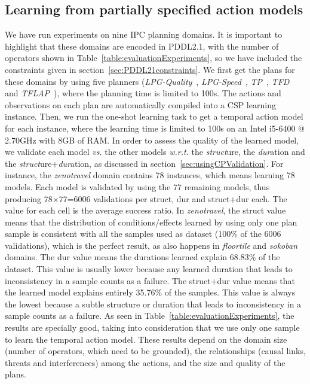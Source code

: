 \documentclass{ecai}
\begin{document}
\subsection{Learning from partially specified action models}

We have run experiments on nine IPC planning domains. It is important to highlight that these domains are encoded in PDDL2.1, with the number of operators shown in Table~\ref{table:evaluationExperiments}, so we have included the constraints given in section~\ref{sec:PDDL21constraints}. We first get the plans for these domains by using five planners (\textit{LPG-Quality}~\cite{gerevini2003planning}, \textit{LPG-Speed}~\cite{gerevini2003planning}, \textit{TP}~\cite{jimenez2015temporal}, \textit{TFD}~\cite{eyerich2009using} and \textit{TFLAP}~\cite{marzal2016temporal}), where the planning time is limited to 100s.
The actions and observations on each plan are automatically compiled into a CSP learning instance. Then,
we run the one-shot learning task to get a temporal action model for each instance, where the learning time is limited to 100s on an Intel i5-6400 @ 2.70GHz with 8GB of RAM.
In order to assess the quality of the learned model, we validate each model \emph{vs.} the other models \emph{w.r.t.} the \emph{struct}ure, the \emph{dur}ation and the \emph{struct}ure+\emph{dur}ation, as discussed in section~\ref{sec:usingCPValidation}.
For instance, the \emph{zenotravel} domain contains 78 instances, which means learning 78 models. Each model is validated by using the 77 remaining models, thus producing 78$\times$77=6006 validations per struct, dur and struct+dur each. The value for each cell is the average success ratio.
In \emph{zenotravel}, the struct value means that the distribution of conditions/effects learned by using only one plan sample is consistent with all the samples used as dataset (100\% of the 6006 validations), which is the perfect result, as also happens in \emph{floortile} and \emph{sokoban} domains.
The dur value means the durations learned explain 68.83\% of the dataset. This value is usually lower because any learned duration that leads to inconsistency in a sample counts as a failure. The struct+dur value means that the learned model explains entirely 35.76\% of the samples. This value is always the lowest because a subtle structure or duration that leads to inconsistency in a sample counts as a failure.
As seen in Table~\ref{table:evaluationExperiments}, the results are specially good, taking into consideration that we use only one sample to learn the temporal action model.
These results depend on the domain size (number of operators, which need to be grounded), the relationships (causal links, threats and interferences) among the actions, and the size and quality of the plans.
\end{document}
